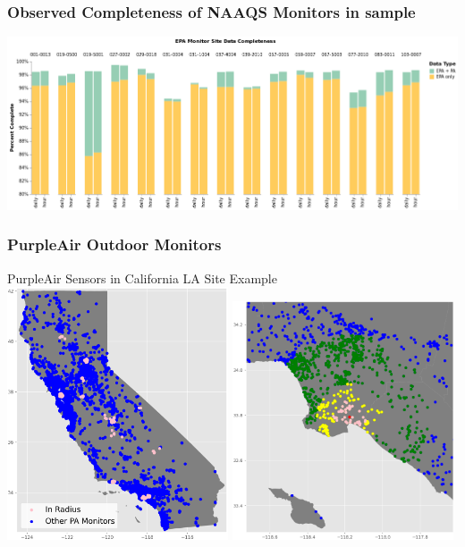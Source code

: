 \documentclass{beamer}
\begin{document}
\begin{frame}
\frametitle{Observed Completeness of NAAQS Monitors in sample}
\includegraphics[width=\textwidth]{output/figures/epa_vs_pa/completeness/completeness_epa_pa.png}
\end{frame}


\begin{frame}
\frametitle{PurpleAir Outdoor Monitors}
\hspace{1em}
PurpleAir Sensors in California 
\hspace{4em}
LA Site Example \\

\includegraphics[width=0.49\textwidth]{output/figures/pa/all_ca_and_15_pa_monitors.png}
\includegraphics[width=0.49\textwidth]{output/figures/concentric_ranges/county-037_site-4004_epa-pa-concentric-ranges.png}
\end{frame}
\end{document}

